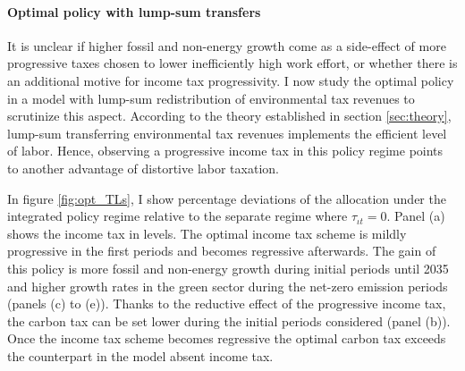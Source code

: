 \paragraph{Optimal policy with lump-sum transfers}\label{subsec:tls}

 It is unclear if higher fossil and non-energy growth come as a side-effect of more progressive taxes chosen to lower inefficiently high work effort, or whether there is an additional motive for income tax progressivity. I now study the optimal policy in a model with lump-sum redistribution of environmental tax revenues to scrutinize this aspect.
 According to the theory established in section \ref{sec:theory}, lump-sum transferring environmental tax revenues implements the efficient level of labor. 
Hence, observing a progressive income tax in this policy regime points to another advantage of distortive labor taxation. 

In figure \ref{fig:opt_TLs}, I show percentage deviations of the allocation under the integrated policy regime relative to the separate regime where $\tau_{\iota t}=0$. 
Panel (a) shows the income tax in levels.
The optimal income tax scheme is mildly progressive in the first periods and becomes regressive afterwards. The gain of this policy is more fossil and non-energy growth during initial periods until 2035  and higher growth rates in the green sector during the net-zero emission periods (panels (c) to (e)). %
Thanks to the reductive effect of the progressive income tax, the carbon tax can be set lower during the initial periods considered (panel (b)). Once the income tax scheme becomes regressive the optimal carbon tax exceeds the counterpart in the model absent income tax. 



